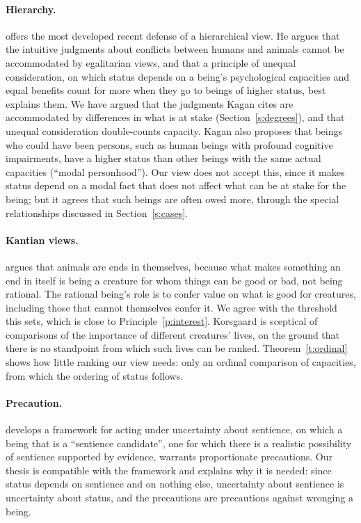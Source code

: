 \documentclass{situationist-preprint}
\begin{document}
\paragraph{Hierarchy.} \citet{Kagan2019} offers the most developed recent defense of a hierarchical view. He argues that the intuitive judgments about conflicts between humans and animals cannot be accommodated by egalitarian views, and that a principle of unequal consideration, on which status depends on a being's psychological capacities and equal benefits count for more when they go to beings of higher status, best explains them. We have argued that the judgments Kagan cites are accommodated by differences in what is at stake (Section~\ref{s:degrees}), and that unequal consideration double-counts capacity. Kagan also proposes that beings who could have been persons, such as human beings with profound cognitive impairments, have a higher status than other beings with the same actual capacities (\enquote{modal personhood}). Our view does not accept this, since it makes status depend on a modal fact that does not affect what can be at stake for the being; but it agrees that such beings are often owed more, through the special relationships discussed in Section~\ref{s:cases}.

\paragraph{Kantian views.} \citet{Korsgaard2018} argues that animals are ends in themselves, because what makes something an end in itself is being a creature for whom things can be good or bad, not being rational. The rational being's role is to confer value on what is good for creatures, including those that cannot themselves confer it. We agree with the threshold this sets, which is close to Principle~\ref{p:interest}. Korsgaard is sceptical of comparisons of the importance of different creatures' lives, on the ground that there is no standpoint from which such lives can be ranked. Theorem~\ref{t:ordinal} shows how little ranking our view needs: only an ordinal comparison of capacities, from which the ordering of status follows.

\paragraph{Precaution.} \citet{Birch2024} develops a framework for acting under uncertainty about sentience, on which a being that is a \enquote{sentience candidate}, one for which there is a realistic possibility of sentience supported by evidence, warrants proportionate precautions. Our thesis is compatible with the framework and explains why it is needed: since status depends on sentience and on nothing else, uncertainty about sentience is uncertainty about status, and the precautions are precautions against wronging a being.
\end{document}
